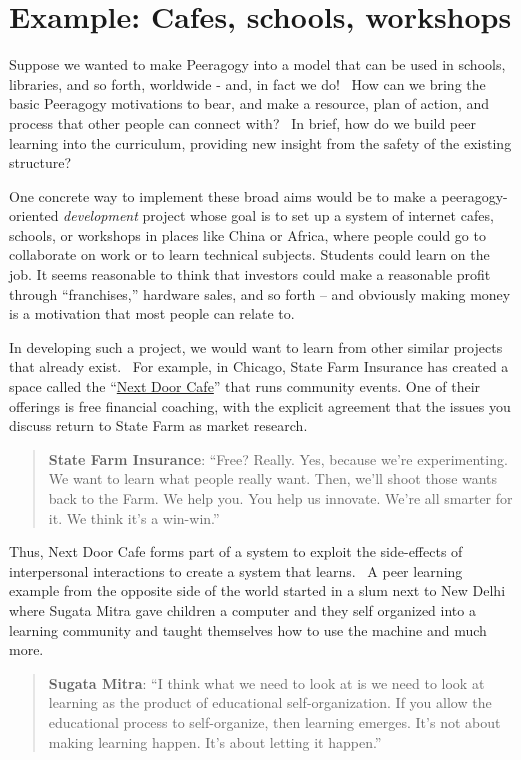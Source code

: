 \section*{Example: Cafes, schools, workshops}

Suppose we wanted to make Peeragogy into a model that can be used in
schools, libraries, and so forth, worldwide - and, in fact we do! ~How
can we bring the basic Peeragogy motivations to bear, and make a
resource, plan of action, and process that other people can connect
with? ~In brief, how do we build peer learning into the
curriculum, providing new insight from the safety of the existing
structure?

One concrete way to implement these broad aims would be to make a
peeragogy-oriented \emph{development} project whose goal is to set up a
system of internet cafes, schools, or workshops in places like China or
Africa, where people could go to collaborate on work or to learn
technical subjects. Students could learn on the job. It seems reasonable
to think that investors could make a reasonable profit through
``franchises,'' hardware sales, and so forth -- and obviously making
money is a motivation that most people can relate to.

In developing such a project, we would want to learn from other similar
projects that already exist. ~For example, in Chicago, State Farm
Insurance has created a space called the
``\href{https://www.nextdoorchi.com/}{Next Door Cafe}'' that runs
community events. One of their offerings is free financial coaching,
with the explicit agreement that the issues you discuss return to State
Farm as market research.

\begin{quote}
\textbf{State Farm Insurance}: ``Free? Really. Yes, because we're
experimenting.  We want to learn what people really want. Then, we'll
shoot those wants back to the Farm. We help you. You help us
innovate. We're all smarter for it. We think it's a win-win.''
\end{quote}

Thus, Next Door Cafe forms part of a system to exploit the side-effects
of interpersonal interactions to create a system that learns.~ A peer
learning example from the opposite side of the world started in a slum
next to New Delhi where Sugata Mitra gave children a computer and they
self organized into a learning community and taught themselves how to
use the machine and much more.

\begin{quote}
\textbf{Sugata Mitra}: ``I think what we need to look at is we need to
look at learning as the product of educational self-organization. If
you allow the educational process to self-organize, then learning
emerges.  It's not about making learning happen. It's about letting it
happen.''
\end{quote}


